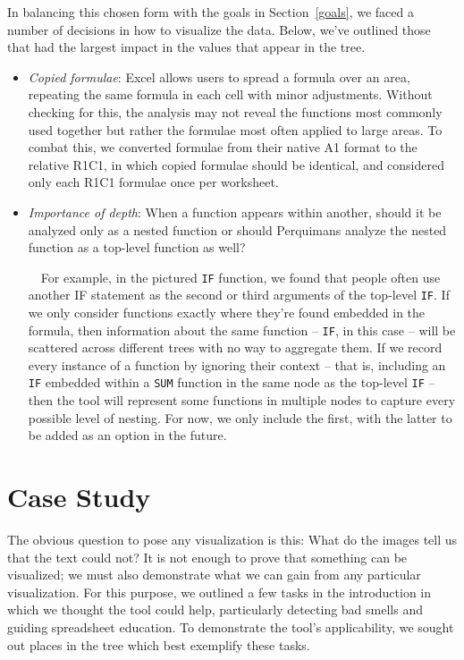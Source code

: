 \documentclass[conference]{IEEEtran}
\newcommand{\toolname}{Perquimans\xspace} \newcommand{\toolnameend}{Perquimans}
\begin{document}
	In balancing this chosen form with the goals in Section~\ref{goals}, we faced a
	number of decisions in how to visualize the data. Below, we've outlined those
	that had the largest impact in the values that appear in the tree.
	\begin{itemize}
		
		\item \textit{Copied formulae}: Excel allows users to spread a formula over an
		area, repeating the same formula in each cell with minor adjustments. Without
		checking for this, the analysis may not reveal the functions most commonly
		used together but rather the formulae most often applied to large areas. To
		combat this, we converted formulae from their native A1 format to the relative
		R1C1, in which copied formulae should be identical, and considered only each
		R1C1 formulae once per worksheet.
		
		\item \textit{Importance of depth}: When a function appears within another,
		should it be analyzed only as a nested function or should \toolname
		analyze the nested function as a top-level function as well? 
		
		\ \ For example, in the pictured \texttt{IF} function, we found that people often use
		another IF statement as the second or third arguments of the top-level \texttt{IF}. If
		we only consider functions exactly where they're found embedded in the
		formula, then information about the same function -- \texttt{IF}, in this case -- will
		be scattered across different trees with no way to aggregate them. If we
		record every instance of a function by ignoring their context -- that is,
		including an \texttt{IF} embedded within a \texttt{SUM} function in the same node as the
		top-level \texttt{IF} -- then the tool will represent some functions in multiple nodes
		to capture every possible level of nesting. For now, we only include the
		first, with the latter to be added as an option in the future.
		
	\end{itemize}
	
	\section{Case Study} The obvious question to pose any visualization is this:
	What do the images tell us that the text could not? It is not enough to prove
	that something can be visualized; we must also demonstrate what we can gain
	from any particular visualization. For this purpose, we outlined a few tasks in the
	introduction in which we thought the tool could help, particularly detecting bad smells and
	guiding spreadsheet education. To demonstrate the tool's applicability, we
	sought out places in the tree which best exemplify these tasks.
	
\end{document}
